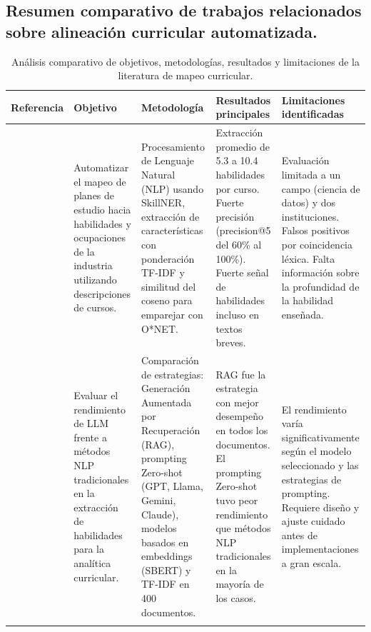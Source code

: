 
\subsection{Resumen comparativo de trabajos relacionados sobre alineación curricular automatizada.}
\begin{landscape}
\footnotesize
\renewcommand{\baselinestretch}{1.0}\selectfont
\renewcommand{\arraystretch}{1.2}
\begin{xltabular}{\linewidth}{p{2.2cm} X X X X}
    \caption{Análisis comparativo de objetivos, metodologías, resultados y limitaciones de la literatura de mapeo curricular.} \label{tab:estado_arte} \\
    \toprule
    \textbf{Referencia} &
    \textbf{Objetivo}   &
    \textbf{Metodología} &
    \textbf{Resultados principales} &
    \textbf{Limitaciones identificadas} \\
    \midrule
    \endhead

    \citep{russell_e_mapping_2024} & 
    Automatizar el mapeo de planes de estudio hacia habilidades y ocupaciones de la industria utilizando descripciones de cursos. & 
    Procesamiento de Lenguaje Natural (NLP) usando SkillNER, extracción de características con ponderación TF-IDF y similitud del coseno para emparejar con O*NET. & 
    Extracción promedio de 5.3 a 10.4 habilidades por curso. Fuerte precisión (precision@5 del 60\% al 100\%). Fuerte señal de habilidades incluso en textos breves. & 
    Evaluación limitada a un campo (ciencia de datos) y dos instituciones. Falsos positivos por coincidencia léxica. Falta información sobre la profundidad de la habilidad enseñada. \\
    \addlinespace
    
    \citep{cristea_course_2025} & 
    Evaluar el rendimiento de LLM frente a métodos NLP tradicionales en la extracción de habilidades para la analítica curricular. & 
    Comparación de estrategias: Generación Aumentada por Recuperación (RAG), prompting Zero-shot (GPT, Llama, Gemini, Claude), modelos basados en embeddings (SBERT) y TF-IDF en 400 documentos. & 
    RAG fue la estrategia con mejor desempeño en todos los documentos. El prompting Zero-shot tuvo peor rendimiento que métodos NLP tradicionales en la mayoría de los casos. & 
    El rendimiento varía significativamente según el modelo seleccionado y las estrategias de prompting. Requiere diseño y ajuste cuidado antes de implementaciones a gran escala. \\
    \addlinespace
    

\end{xltabular}
\end{landscape}
